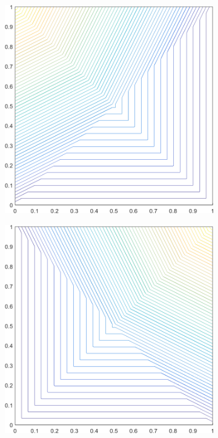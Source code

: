 \begin{figure}
\label{fig::2D_PWLD1_unit_square_basis_functions}
\centering
	\begin{subfigure}[b]{0.39\textwidth}
		\centering
		\includegraphics[width=\textwidth]{figures/sec_BF/square_PWLD1_contour_b4.png}
		\caption{}
	\end{subfigure}
	\hspace{1.5cm}
	\begin{subfigure}[b]{0.39\textwidth}
		\centering
		\includegraphics[width=\textwidth]{figures/sec_BF/square_PWLD1_contour_b3.png}

\end{subfigure}
\end{figure}
